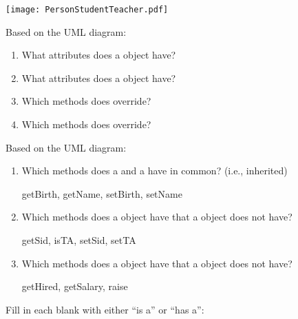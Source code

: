 
\begin{center}
\texttt{[image: PersonStudentTeacher.pdf]}
\end{center}




\Q Based on the UML diagram:

\begin{enumerate}
\item What attributes does a  object have?

\item What attributes does a  object have?

\item Which methods does  override?

\item Which methods does  override?
\end{enumerate}


\Q Based on the UML diagram:

\setlength{\defaultwidth}{20em}

\begin{enumerate}
\item Which methods does a  and a  have in common? (i.e., inherited)
\begin{answer}[1em]
getBirth, getName, setBirth, setName
\end{answer}

\item Which methods does a  object have that a  object does not have?
\begin{answer}[1em]
getSid, isTA, setSid, setTA
\end{answer}

\item Which methods does a  object have that a  object does not have?
\begin{answer}[1em]
getHired, getSalary, raise
\end{answer}
\end{enumerate}

\vspace{-2em}


\Q Fill in each blank with either ``is a'' or ``has a'':

\setlength{\defaultwidth}{4em}

